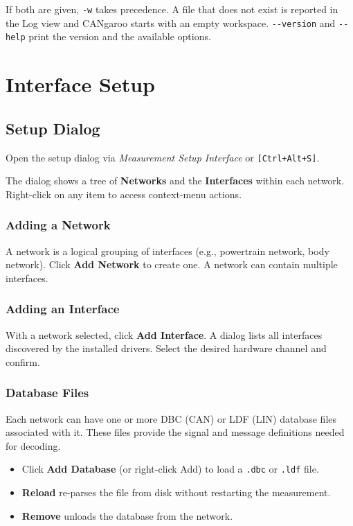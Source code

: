 \documentclass[a4paper,11pt]{article}
\newcommand{\key}[1]{\texttt{\small[#1]}}
\newcommand{\menu}[1]{\textit{#1}}
\newcommand{\ui}[1]{\textbf{#1}}
\newcommand{\file}[1]{\texttt{#1}}
\begin{document}
If both are given, \texttt{-w} takes precedence. A file that does not exist is reported in
the Log view and CANgaroo starts with an empty workspace. \texttt{-{}-version} and
\texttt{-{}-help} print the version and the available options.

\section{Interface Setup}
\label{sec:setup}

\subsection{Setup Dialog}

Open the setup dialog via \menu{Measurement \textrightarrow{} Setup Interface} or
\key{Ctrl+Alt+S}.

The dialog shows a tree of \textbf{Networks} and the \textbf{Interfaces} within each network.
Right-click on any item to access context-menu actions.

\subsubsection{Adding a Network}

A network is a logical grouping of interfaces (e.g., powertrain network, body network).
Click \ui{Add Network} to create one. A network can contain multiple interfaces.

\subsubsection{Adding an Interface}

With a network selected, click \ui{Add Interface}. A dialog lists all interfaces
discovered by the installed drivers. Select the desired hardware channel and confirm.

\subsubsection{Database Files}

Each network can have one or more DBC (CAN) or LDF (LIN) database files associated
with it. These files provide the signal and message definitions needed for decoding.

\begin{itemize}
  \item Click \ui{Add Database} (or right-click \textrightarrow{} Add) to load a \file{.dbc}
        or \file{.ldf} file.
  \item \ui{Reload} re-parses the file from disk without restarting the measurement.
  \item \ui{Remove} unloads the database from the network.
\end{itemize}
\end{document}

